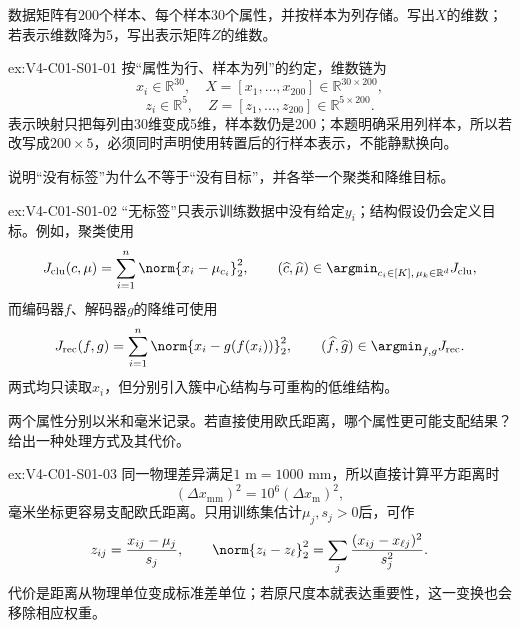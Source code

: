 \begin{SLChapterExercisePairSection}

\begin{exercise}\label{ex:V4-C01-S01-01}
数据矩阵有$200$个样本、每个样本$30$个属性，并按样本为列存储。写出$X$的维数；若表示维数降为5，写出表示矩阵$Z$的维数。
\end{exercise}
\ifSLFullEdition
{}\label{sol:V4-C01-S01-01}
\begin{chapterexercisesolution}{ex:V4-C01-S01-01}
按“属性为行、样本为列”的约定，维数链为
\[
x_i\in\mathbb R^{30},\quad
X=[x_1,\ldots,x_{200}]\in\mathbb R^{30\times200},
\]
\[
z_i\in\mathbb R^{5},\quad
Z=[z_1,\ldots,z_{200}]\in\mathbb R^{5\times200}.
\]
表示映射只把每列由30维变成5维，样本数仍是200；本题明确采用列样本，所以若改写成$200\times5$，必须同时声明使用转置后的行样本表示，不能静默换向。
\end{chapterexercisesolution}
\fi

\begin{exercise}\label{ex:V4-C01-S01-02}
说明“没有标签”为什么不等于“没有目标”，并各举一个聚类和降维目标。
\end{exercise}
\ifSLFullEdition
{}\label{sol:V4-C01-S01-02}
\begin{chapterexercisesolution}{ex:V4-C01-S01-02}
“无标签”只表示训练数据中没有给定$y_i$；结构假设仍会定义目标。例如，\kMeans{}聚类使用
\[
J_{\mathrm{clu}}(c,\mu)
=\sum_{i=1}^{n}\norm{x_i-\mu_{c_i}}_2^2,
\qquad
(\widehat c,\widehat\mu)\in\argmin_{c_i\in[K],\,\mu_k\in\mathbb R^d}J_{\mathrm{clu}},
\]
而编码器$f$、解码器$g$的降维可使用
\[
J_{\mathrm{rec}}(f,g)
=\sum_{i=1}^{n}\norm{x_i-g(f(x_i))}_2^2,
\qquad
(\widehat f,\widehat g)\in\argmin_{f,g}J_{\mathrm{rec}}.
\]
两式均只读取$x_i$，但分别引入簇中心结构与可重构的低维结构。
\end{chapterexercisesolution}
\fi

\begin{exercise}\label{ex:V4-C01-S01-03}
两个属性分别以米和毫米记录。若直接使用欧氏距离，哪个属性更可能支配结果？给出一种处理方式及其代价。
\end{exercise}
\ifSLFullEdition
{}\label{sol:V4-C01-S01-03}
\begin{chapterexercisesolution}{ex:V4-C01-S01-03}
同一物理差异满足$1\text{ m}=1000\text{ mm}$，所以直接计算平方距离时
\[
(\Delta x_{\mathrm{mm}})^2
=10^6(\Delta x_{\mathrm m})^2,
\]
毫米坐标更容易支配欧氏距离。只用训练集估计$\mu_j,s_j>0$后，可作
\[
z_{ij}=\frac{x_{ij}-\mu_j}{s_j},
\qquad
\norm{z_i-z_\ell}_2^2
=\sum_j\frac{(x_{ij}-x_{\ell j})^2}{s_j^2}.
\]
代价是距离从物理单位变成标准差单位；若原尺度本就表达重要性，这一变换也会移除相应权重。
\end{chapterexercisesolution}
\fi


\end{SLChapterExercisePairSection}
